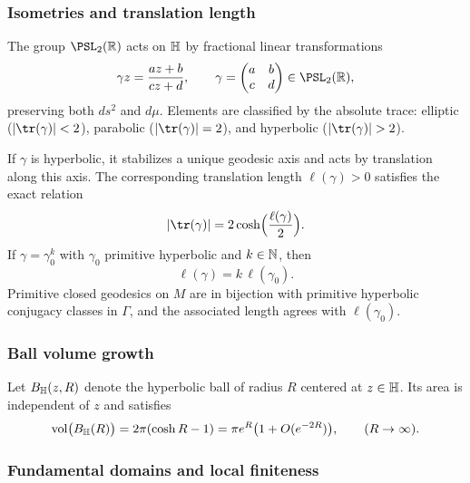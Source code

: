 \subsubsection{Isometries and translation length}

The group $\PSL_2(\R)$ acts on $\mathbb{H}$ by fractional linear transformations
\begin{equation}\label{eq:mobius-action}
\gamma z=\frac{az+b}{cz+d},
\qquad
\gamma=
\begin{pmatrix}a&b\\c&d\end{pmatrix}
\in\PSL_2(\R),
\end{equation}
preserving both $ds^{2}$ and $d\mu$. Elements are classified by the absolute trace:
elliptic ($|\tr(\gamma)|<2$), parabolic ($|\tr(\gamma)|=2$), and hyperbolic ($|\tr(\gamma)|>2$).

If $\gamma$ is hyperbolic, it stabilizes a unique geodesic axis and acts by translation along this axis.
The corresponding translation length $\ell(\gamma)>0$ satisfies the exact relation
\begin{equation}\label{eq:length-trace}
|\tr(\gamma)|
=
2\cosh\!\Big(\frac{\ell(\gamma)}{2}\Big).
\end{equation}
If $\gamma=\gamma_{0}^{k}$ with $\gamma_{0}$ primitive hyperbolic and $k\in\mathbb{N}$, then
\begin{equation}\label{eq:length-power}
\ell(\gamma)=k\,\ell(\gamma_{0}).
\end{equation}
Primitive closed geodesics on $M$ are in bijection with primitive hyperbolic conjugacy classes in $\Gamma$,
and the associated length agrees with $\ell(\gamma_{0})$.

\subsubsection{Ball volume growth}

Let $B_{\mathbb{H}}(z,R)$ denote the hyperbolic ball of radius $R$ centered at $z\in\mathbb{H}$.
Its area is independent of $z$ and satisfies
\begin{equation}\label{eq:ball-area}
\mathop{\mathrm{vol}}\nolimits\bigl(B_{\mathbb{H}}(R)\bigr)
=
2\pi(\cosh R-1)
=
\pi e^{R}\bigl(1+O(e^{-2R})\bigr),
\qquad
(R\to\infty).
\end{equation}

\subsubsection{Fundamental domains and local finiteness}

